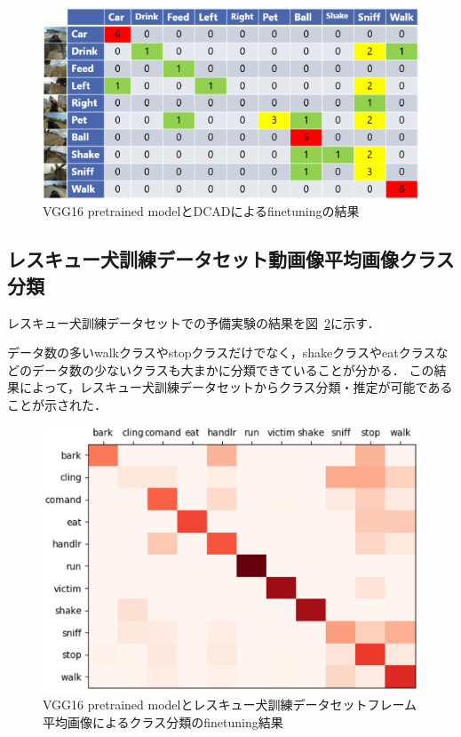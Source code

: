 \begin{figure}[htbp]
   \begin{center}

    \includegraphics[scale=0.5]{./Figures/vgg16_res.eps}
    \caption{VGG16 pretrained modelとDCADによるfinetuningの結果}
    \label{vgg16_res}
   \end{center}
\end{figure}

\subsection{レスキュー犬訓練データセット動画像平均画像クラス分類}
レスキュー犬訓練データセットでの予備実験の結果を図~\ref{sub_resque_res}に示す．

データ数の多いwalkクラスやstopクラスだけでなく，shakeクラスやeatクラスなどのデータ数の少ないクラスも大まかに分類できていることが分かる．
この結果によって，レスキュー犬訓練データセットからクラス分類・推定が可能であることが示された．
\begin{figure}[htbp]
  \begin{center}
    \includegraphics[scale=0.7]{./Figures/resque_mean_result.eps}
    \caption{VGG16 pretrained modelとレスキュー犬訓練データセットフレーム平均画像によるクラス分類のfinetuning結果}
    \label{sub_resque_res}
  \end{center}
\end{figure}

